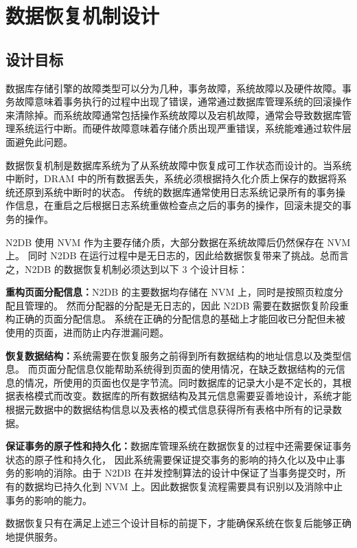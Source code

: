 
\chapter{数据恢复机制设计}
\label{chap:recovery}

\section{设计目标}


数据库存储引擎的故障类型可以分为几种，事务故障，系统故障以及硬件故障。事务故障意味着事务执行的过程中出现了错误，通常通过数据库管理系统的回滚操作来清除掉。而系统故障通常包括操作系统故障以及宕机故障，通常会导致数据库管理系统运行中断。而硬件故障意味着存储介质出现严重错误，系统能难通过软件层面避免此问题。

数据恢复机制是数据库系统为了从系统故障中恢复成可工作状态而设计的。当系统中断时，DRAM 中的所有数据丢失，系统必须根据持久化介质上保存的数据将系统还原到系统中断时的状态。
传统的数据库通常使用日志系统记录所有的事务操作信息，在重启之后根据日志系统重做检查点之后的事务的操作，回滚未提交的事务的操作。

N2DB 使用 NVM 作为主要存储介质，大部分数据在系统故障后仍然保存在 NVM 上。
同时 N2DB 在运行过程中是无日志的，因此给数据恢复带来了挑战。总而言之，N2DB 的数据恢复机制必须达到以下 3 个设计目标：

\textbf{重构页面分配信息：}N2DB 的主要数据均存储在 NVM 上，同时是按照页粒度分配且管理的。
然而分配器的分配是无日志的，因此 N2DB 需要在数据恢复阶段重构正确的页面分配信息。
系统在正确的分配信息的基础上才能回收已分配但未被使用的页面，进而防止内存泄漏问题。

\textbf{恢复数据结构：}系统需要在恢复服务之前得到所有数据结构的地址信息以及类型信息。
而页面分配信息仅能帮助系统得到页面的使用情况，在缺乏数据结构的元信息的情况，所使用的页面也仅是字节流。同时数据库的记录大小是不定长的，其根据表格模式而改变。数据库的所有数据结构及其元信息需要妥善地设计，系统才能根据元数据中的数据结构信息以及表格的模式信息获得所有表格中所有的记录数据。

\textbf{保证事务的原子性和持久化：}数据库管理系统在数据恢复的过程中还需要保证事务状态的原子性和持久化，
因此系统需要保证提交事务的影响的持久化以及中止事务的影响的消除。由于 N2DB 在并发控制算法的设计中保证了当事务提交时，所有的数据均已持久化到 NVM 上。因此数据恢复流程需要具有识别以及消除中止事务的影响的能力。

数据恢复只有在满足上述三个设计目标的前提下，才能确保系统在恢复后能够正确地提供服务。



